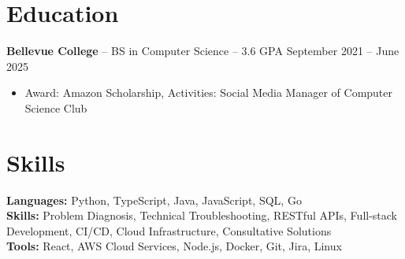 \documentclass[11pt]{article}       %
\begin{document}

\vspace{-18.5pt}

\section*{Education}
\textbf{Bellevue College} -- BS in Computer Science -- 3.6 GPA \hfill September 2021 -- June 2025\\
\vspace{-9pt}
\begin{itemize}
  \item Award: Amazon Scholarship, Activities: Social Media Manager of Computer Science Club
\end{itemize}

\vspace{-18.5pt}

\section*{Skills}
\textbf{Languages:} Python, TypeScript, Java, JavaScript, SQL, Go\\
\textbf{Skills:} Problem Diagnosis, Technical Troubleshooting, RESTful APIs, Full-stack Development, CI/CD, Cloud Infrastructure, Consultative Solutions\\
\textbf{Tools:} React, AWS Cloud Services, Node.js, Docker, Git, Jira, Linux

\vspace{-6.5pt}
\end{document}
